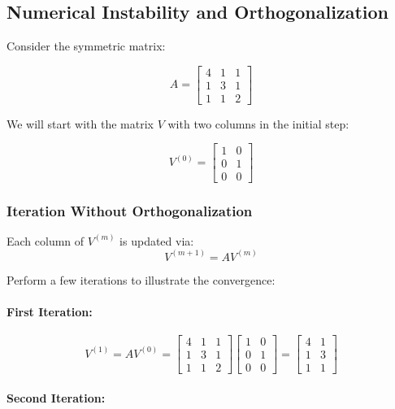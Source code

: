 \subsection*{Numerical Instability and Orthogonalization}


Consider the symmetric matrix:

$$
A = \begin{bmatrix} 4 & 1 & 1 \\ 1 & 3 & 1 \\ 1 & 1 & 2 \end{bmatrix}
$$

We will start with the matrix $V$ with two columns in the initial step:

$$
V^{(0)} = \begin{bmatrix} 1 & 0 \\ 0 & 1 \\ 0 & 0 \end{bmatrix}
$$

\subsubsection*{Iteration Without Orthogonalization}

Each column of $ V^{(m)} $ is updated via:
$$
V^{(m+1)} = A V^{(m)}
$$

Perform a few iterations to illustrate the convergence:

\paragraph{First Iteration:}

$$
V^{(1)} = A V^{(0)} = \begin{bmatrix} 4 & 1 & 1 \\ 1 & 3 & 1 \\ 1 & 1 & 2 \end{bmatrix} \begin{bmatrix} 1 & 0 \\ 0 & 1 \\ 0 & 0 \end{bmatrix} = \begin{bmatrix} 4 & 1 \\ 1 & 3 \\ 1 & 1 \end{bmatrix}
$$

\paragraph{Second Iteration:}

